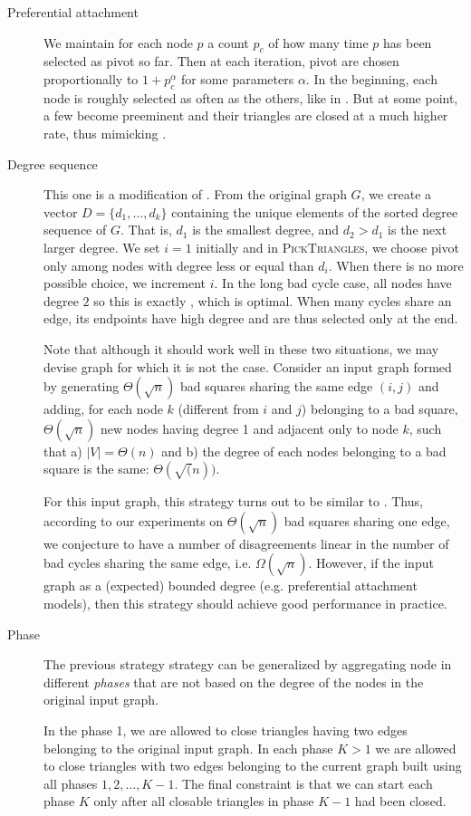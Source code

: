 \begin{description}
	\item[Preferential attachment] We maintain for each node $p$ a count
		$p_c$ of how many time $p$ has been selected as pivot so far. Then at
		each iteration, pivot are chosen proportionally to $1+p_c^\alpha$ for
		some parameters $\alpha$.
		In the beginning, each node is roughly selected as often as the
		others, like in \pot{}. But at some point, a few become preeminent
		and their triangles are closed at a much higher rate, thus
		mimicking \pat{}.
	\item[Degree sequence] This one is a modification of \pat{}. From the
		original graph $G$, we create a vector $D=\{d_1, \ldots, d_k\}$
		containing the unique elements of the sorted degree sequence of $G$.
		That is,
		$d_1$ is the smallest degree, and $d_2 > d_1$ is the next larger  degree.
	We set $i=1$ initially and in \textsc{PickTriangles}, we choose pivot
	only among nodes with degree less or equal than $d_i$. When there is no more
	possible choice, we increment $i$. In the long bad cycle case, all nodes
	have degree $2$ so this is exactly \pat{}, which is optimal. When many
	cycles share an edge, its endpoints have high degree and are thus
	selected only at the end.

	Note that although it should work well in these two situations, we may
	devise graph for which it is not the case. 
	Consider an input graph formed by generating $\Theta(\sqrt{n})$ bad
	squares sharing the same edge $(i,j)$ and adding, for each node $k$
	(different from $i$ and $j$) belonging to a bad square, $\Theta(\sqrt n)$
	new nodes having degree 1 and adjacent only to node $k$, such that a)
	$|V|=\Theta(n)$ and b) the degree of each nodes belonging to a bad square is
	the same: $\Theta(\sqrt(n))$.

	For this input graph, this strategy turns out to be similar to \pat{}.
	Thus, according to our experiments on $\Theta(\sqrt n)$ bad squares
	sharing one edge, we conjecture to have a number of disagreements linear
	in the number of bad cycles sharing the same edge, i.e.
	$\Omega(\sqrt{n})$. However, if the input graph as a (expected) bounded
	degree (e.g. preferential attachment models), then this strategy should
	achieve good performance in practice.

	\item[Phase] The previous strategy strategy can be generalized by
		aggregating node in different \emph{phases} that are not based on the
		degree of the nodes in the original input graph.

		In the phase 1, we are allowed to close triangles having two edges
		belonging to the original input graph. In each phase $K>1$ we are
		allowed to close triangles with two edges belonging to the current
		graph built using all phases $1,2, \ldots, K-1$. The final constraint
		is that we can start each phase $K$ only after all closable triangles
		in phase $K-1$ had been closed.
\end{description}

